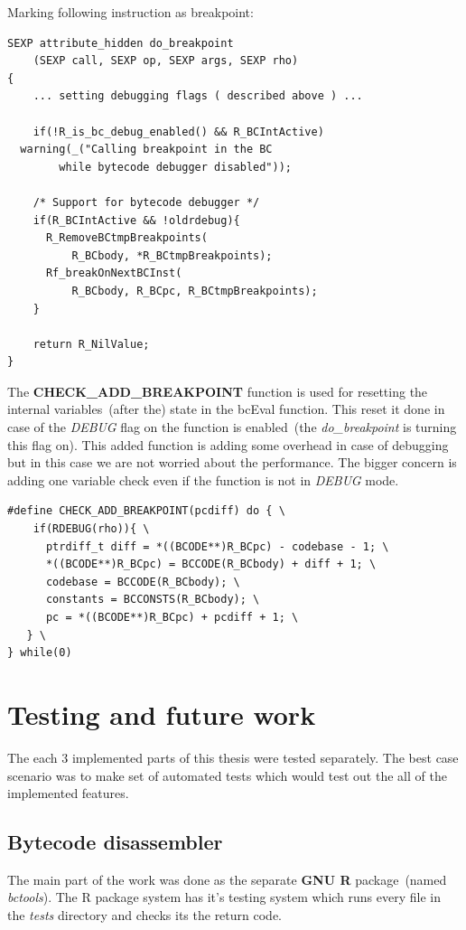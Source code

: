 \documentclass[thesis=M,english]{FITthesis}[2018/10/20]
\begin{document}
Marking following instruction as breakpoint:
\begin{lstlisting}
SEXP attribute_hidden do_breakpoint
	(SEXP call, SEXP op, SEXP args, SEXP rho)
{
	... setting debugging flags ( described above ) ...

    if(!R_is_bc_debug_enabled() && R_BCIntActive)
  warning(_("Calling breakpoint in the BC 
  		while bytecode debugger disabled"));

    /* Support for bytecode debugger */
    if(R_BCIntActive && !oldrdebug){
      R_RemoveBCtmpBreakpoints(
          R_BCbody, *R_BCtmpBreakpoints);
      Rf_breakOnNextBCInst(
          R_BCbody, R_BCpc, R_BCtmpBreakpoints);
    }

    return R_NilValue;
}
\end{lstlisting}

The \textbf{CHECK{\_}ADD{\_}BREAKPOINT} function is used for resetting the internal variables~(after the) state in the bcEval function. This reset it done in case of the \textit{DEBUG} flag on the function is enabled~(the \textit{do{\_}breakpoint} is turning this flag on). This added function is adding some overhead in case of debugging but in this case we are not worried about the performance. The bigger concern is adding one variable check even if the function is not in \textit{DEBUG} mode.
\begin{lstlisting}
#define CHECK_ADD_BREAKPOINT(pcdiff) do { \
    if(RDEBUG(rho)){ \
      ptrdiff_t diff = *((BCODE**)R_BCpc) - codebase - 1; \
      *((BCODE**)R_BCpc) = BCCODE(R_BCbody) + diff + 1; \
      codebase = BCCODE(R_BCbody); \
      constants = BCCONSTS(R_BCbody); \
      pc = *((BCODE**)R_BCpc) + pcdiff + 1; \
   } \
} while(0)
\end{lstlisting}

\chapter{Testing and future work}

The each 3 implemented parts of this thesis were tested separately. The best case scenario was to make set of automated tests which would test out the all of the implemented features.

\section{Bytecode disassembler}

The main part of the work was done as the separate \textbf{GNU R} package~(named \textit{bctools}). The R package system has it's testing system which runs every file in the \textit{tests} directory and checks its the return code. 
\end{document}
